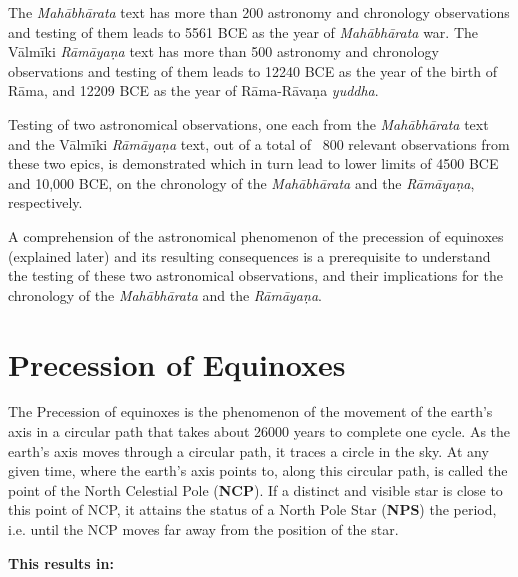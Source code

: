 The \textit{Mahābhārata} text has more than 200 astronomy and chronology observations and testing of them leads to 5561 BCE as the year of \textit{Mahābhārata} war. The Vālmīki \textit{Rāmāyaṇa} text has more than 500 astronomy and chronology observations and testing of them leads to 12240 BCE as the year of the birth of Rāma, and 12209 BCE as the year of Rāma-Rāvaṇa \textit{yuddha}.

Testing of two astronomical observations, one each from the \textit{Mahābhārata} text and the Vālmīki \textit{Rāmāyaṇa} text, out of a total of ~800 relevant observations from these two epics, is demonstrated which in turn lead to lower limits of 4500 BCE and 10,000 BCE, on the chronology of the \textit{Mahābhārata} and the \textit{Rāmāyaṇa}, respectively.

A comprehension of the astronomical phenomenon of the precession of equinoxes (explained later) and its resulting consequences is a prerequisite to understand the testing of these two astronomical observations, and their implications for the chronology of the \textit{Mahābhārata} and the \textit{Rāmāyaṇa}.

\vspace{-.3cm}

\section*{Precession of Equinoxes}

The Precession of equinoxes is the phenomenon of the movement of the earth’s axis in a circular path that takes about 26000 years to complete one cycle. As the earth’s axis moves through a circular path, it traces a circle in the sky. At any given time, where the earth’s axis points to, along this circular path, is called the point of the North Celestial Pole (\textbf{NCP}). If a distinct and visible star is close to this point of NCP, it attains the status of a North Pole Star (\textbf{NPS}) the period, i.e. until the NCP moves far away from the position of the star.

\textbf{This results in:}


